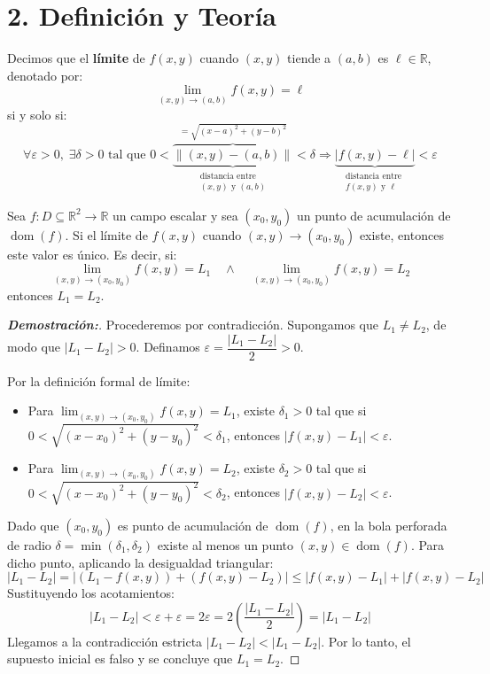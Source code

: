 \documentclass[11pt]{article}
\newenvironment{teoria}{%
  \section*{2. Definición y Teoría}%
}{}
\newenvironment{definicion}[1]{%
  \begin{tcolorbox}[colback=blue!5,colframe=blue!75!black,title=Definición: #1]%
}{%
  \end{tcolorbox}%
}
\newenvironment{teorema}[1]{%
  \begin{tcolorbox}[colback=green!5,colframe=green!75!black,title=Teorema: #1]%
}{%
  \end{tcolorbox}%
}
\begin{document}
\begin{teoria}
\begin{definicion}{Límite de un Campo Escalar ($\varepsilon$-$\delta$)}
    Decimos que el \textbf{límite} de $f(x,y)$ cuando $(x,y)$ tiende a $(a, b)$ es $\ell \in \mathbb{R}$, denotado por:
    $$ \lim_{(x,y) \to (a, b)} f(x,y) = \ell $$
    si y solo si:
    $$ \forall \varepsilon > 0, \; \exists \delta > 0 \text{ tal que } 0 < \overbrace{\underbrace{\|(x,y)-(a,b)\|}_{\begin{array}{l} \text{distancia entre} \\ (x,y) \text{ y } (a,b) \end{array}}}^{=\sqrt{(x-a)^2 + (y-b)^2}} < \delta \Longrightarrow \underbrace{|f(x,y)-\ell|}_{\begin{array}{l} \text{distancia entre } \\ f(x,y) \text{ y } \ell \end{array}} < \varepsilon $$
  \end{definicion}

  \begin{teorema}{Unicidad del Límite}
    Sea $f \colon D \subseteq \mathbb{R}^2 \to \mathbb{R}$ un campo escalar y sea $(x_0, y_0)$ un punto de acumulación de $\operatorname{dom}(f)$. Si el límite de $f(x,y)$ cuando $(x,y) \to (x_0, y_0)$ existe, entonces este valor es único. Es decir, si:
    $$ \lim_{(x,y) \to (x_0, y_0)} f(x,y) = L_1 \quad \wedge \quad \lim_{(x,y) \to (x_0, y_0)} f(x,y) = L_2 $$
    entonces $L_1 = L_2$.
  \end{teorema}

  \begin{proof}[\textbf{Demostración:}]
    Procederemos por contradicción. Supongamos que $L_1 \neq L_2$, de modo que $|L_1 - L_2| > 0$. Definamos $\varepsilon = \dfrac{|L_1 - L_2|}{2} > 0$.

    Por la definición formal de límite:
    \begin{itemize}
      \item Para $\displaystyle \lim_{(x,y) \to (x_0,y_0)} f(x,y) = L_1$, existe $\delta_1 > 0$ tal que si $0 < \sqrt{(x-x_0)^2 + (y-y_0)^2} < \delta_1$, entonces $|f(x,y) - L_1| < \varepsilon$.
      \item Para $\displaystyle \lim_{(x,y) \to (x_0,y_0)} f(x,y) = L_2$, existe $\delta_2 > 0$ tal que si $0 < \sqrt{(x-x_0)^2 + (y-y_0)^2} < \delta_2$, entonces $|f(x,y) - L_2| < \varepsilon$.
    \end{itemize}

    Dado que $(x_0,y_0)$ es punto de acumulación de $\operatorname{dom}(f)$, en la bola perforada de radio $\delta = \min(\delta_1, \delta_2)$ existe al menos un punto $(x,y) \in \operatorname{dom}(f)$. Para dicho punto, aplicando la desigualdad triangular:
    $$ |L_1 - L_2| = |(L_1 - f(x,y)) + (f(x,y) - L_2)| \leq |f(x,y) - L_1| + |f(x,y) - L_2| $$
    Sustituyendo los acotamientos:
    $$ |L_1 - L_2| < \varepsilon + \varepsilon = 2\varepsilon = 2 \left( \dfrac{|L_1 - L_2|}{2} \right) = |L_1 - L_2| $$
    Llegamos a la contradicción estricta $|L_1 - L_2| < |L_1 - L_2|$. Por lo tanto, el supuesto inicial es falso y se concluye que $L_1 = L_2$.
  \end{proof}


\end{teoria}
\end{document}
